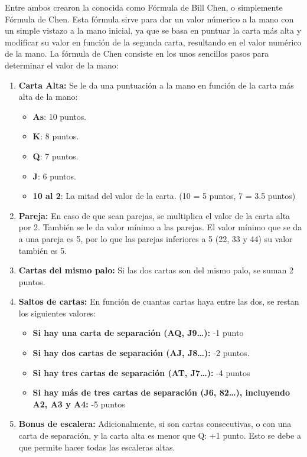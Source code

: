 Entre ambos crearon la conocida como Fórmula de Bill Chen, o simplemente Fórmula de Chen. Esta fórmula sirve para dar un valor númerico a la mano con un simple vistazo a la mano inicial, ya que se basa en puntuar la carta más alta y modificar su valor en función de la segunda carta, resultando en el valor numérico de la mano.  La fórmula de Chen consiste en los unos sencillos pasos para determinar el valor de la mano:

\begin{enumerate}
\item \textbf{Carta Alta:} Se le da una puntuación a la mano en función de la carta más alta de la mano:
\begin{itemize}
\item \textbf{As}: 10 puntos.
\item \textbf{K}: 8 puntos.
\item \textbf{Q}: 7 puntos.
\item \textbf{J}: 6 puntos.
\item \textbf{10 al 2}: La mitad del valor de la carta. (10 = 5 puntos, 7 = 3.5 puntos)
\end{itemize}
\item \textbf{Pareja:}  En caso de que sean parejas, se multiplica el valor de la carta alta por 2. También se le da valor mínimo a las parejas. El valor mínimo que se da a una pareja es  5, por lo que las parejas inferiores a 5 (22, 33 y 44) su valor también es 5.
\item \textbf{Cartas del mismo palo:} Si las dos cartas son del mismo palo, se suman 2 puntos.
\item \textbf{Saltos de cartas:} En función de cuantas cartas haya entre las dos, se restan los siguientes valores:
\begin{itemize}
\item \textbf{Si hay una carta de separación (AQ, J9…): } -1 punto
\item \textbf{Si hay dos cartas de separación (AJ, J8…): } -2 puntos.
\item \textbf{Si hay tres cartas de separación (AT, J7…): } -4 puntos
\item \textbf{Si hay más de tres cartas de separación (J6, 82…), incluyendo A2, A3 y A4:} -5 puntos
\end{itemize}
\item \textbf{Bonus de escalera:} Adicionalmente, si son cartas consecutivas, o con una carta de separación, y la carta alta es menor que Q: +1 punto. Esto se debe a que permite hacer todas las escaleras altas.
\end{enumerate}

